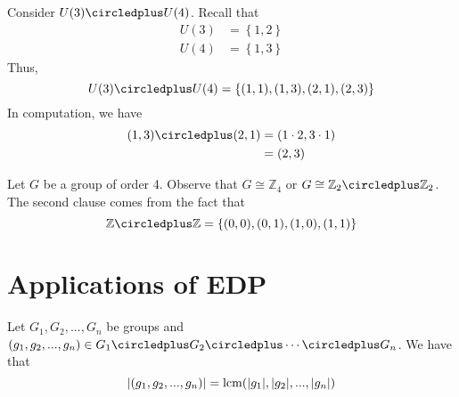 \begin{nexample}
    Consider \(U(3) \circledplus U(4)\). Recall that
    \[
    \begin{aligned}
        U(3) &= \left\{1, 2\right\} \\
        U(4) &= \left\{1, 3\right\}
    \end{aligned}
    \]
    Thus, 
    \[
        U(3) \circledplus U(4) = \left\{(1, 1), (1, 3), (2, 1), (2, 3)\right\}
    \]
    In computation, we have
    \[
    \begin{aligned}
        (1, 3) \circledplus (2, 1) &= (1 \cdot 2, 3 \cdot 1) \\
                                   &= (2, 3)
    \end{aligned}
    \]
\end{nexample}

\begin{nexample}
    Let \(G\) be a group of order 4. Observe that \(G \cong \mathbb{Z}_4\) or \(G \cong \mathbb{Z}_2 \circledplus \mathbb{Z}_2\). The second clause comes from the fact that
    \[
        \mathbb{Z} \circledplus \mathbb{Z} = \left\{(0, 0), (0, 1), (1, 0), (1, 1)\right\}
    \]
\end{nexample}

\section{Applications of EDP}

\begin{theorem}
    Let \(G_1, G_2, ..., G_n\) be groups and \((g_1, g_2, ..., g_n) \in G_1 \circledplus G_2 \circledplus \cdots \circledplus G_n\). We have that
    \[
        |(g_1, g_2, ..., g_n)| = \operatorname{lcm}(|g_1|, |g_2|, ..., |g_n|)
    \]
\end{theorem}
